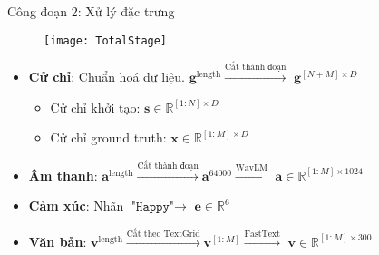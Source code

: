 \begin{frame}{Công đoạn 2: Xử lý đặc trưng}
	
	\begin{figure}
		\texttt{[image: TotalStage]}
	\end{figure}
	
	\begin{itemize}
		\item \textbf{Cử chỉ}: Chuẩn hoá dữ liệu. $\mathbf{g}^{\operatorname{length}} \xrightarrow{ \text{Cắt thành đoạn} }$ $\mathbf{g}^{[N + M] \times D}$
		\begin{itemize}
			\item Cử chỉ khởi tạo: $\mathbf{s} \in \mathbb{R}^{[1:N] \times D}$
			\item Cử chỉ ground truth: $\mathbf{x} \in \mathbb{R}^{[1:M] \times D}$
		\end{itemize} \pause
		
		\item \textbf{Âm thanh}:  $\mathbf{a}^{\operatorname{length}} \xrightarrow{ \text{Cắt thành đoạn} } \mathbf{a}^{64000} \xrightarrow{\text{WavLM} } $ $\mathbf{a} \in \mathbb{R}^{[1:M] \times 1024}$ \pause
		
		\item \textbf{Cảm xúc}:   Nhãn $\texttt{"Happy"} \rightarrow$ $\mathbf{e} \in \mathbb{R}^{6}$ \pause
		
		\item \textbf{Văn bản}:  $\mathbf{v}^{\operatorname{length}} \xrightarrow{ \text{Cắt theo TextGrid} } \mathbf{v}^{[1:M]} \xrightarrow{ \text{FastText} } $ $\mathbf{v} \in \mathbb{R}^{[1:M] \times 300}$
	\end{itemize}
	
\end{frame}

